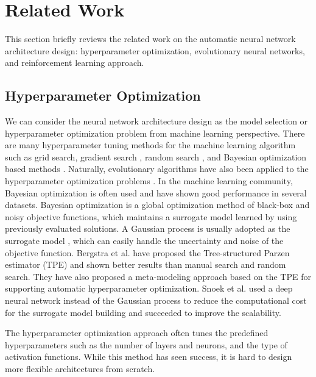 \section{Related Work}
This section briefly reviews the related work on the automatic neural network architecture design: hyperparameter optimization, evolutionary neural networks, and reinforcement learning approach.

\subsection{Hyperparameter Optimization}
We can consider the neural network architecture design as the model selection or hyperparameter optimization problem from machine learning perspective. There are many hyperparameter tuning methods for the machine learning algorithm such as grid search, gradient search \cite{bengio_gradient-based_2000}, random search \cite{bergstra_random_2012}, and Bayesian optimization based methods \cite{hutter_sequential_2011,snoek_practical_2012}. Naturally, evolutionary algorithms have also been applied to the hyperparameter optimization problems \cite{Loshchilov2016}. In the machine learning community, Bayesian optimization is often used and have shown good performance in several datasets. Bayesian optimization is a global optimization method of black-box and noisy objective functions, which maintains a surrogate model learned by using previously evaluated solutions. A Gaussian process is usually adopted as the surrogate model \cite{snoek_practical_2012}, which can easily handle the uncertainty and noise of the objective function.
Bergstra et al. \cite{bergstra_algorithms_2011} have proposed the Tree-structured Parzen estimator (TPE) and shown better results than manual search and random search.
They have also proposed a meta-modeling approach \cite{bergstra_making_2013} based on the TPE for supporting automatic hyperparameter optimization. 
Snoek et al. \cite{snoek_scalable_2015} used a deep neural network instead of the Gaussian process to reduce the computational cost for the surrogate model building and succeeded to improve the scalability.

The hyperparameter optimization approach often tunes the predefined hyperparameters such as the number of layers and neurons, and the type of activation functions. While this method has seen success, it is hard to design more flexible architectures from scratch.

